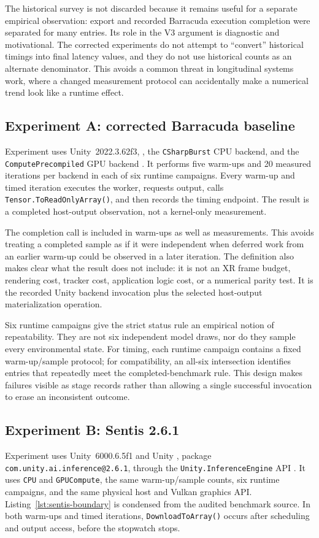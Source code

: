 The historical survey is not discarded because it remains useful for a separate empirical observation: export and recorded Barracuda execution completion were separated for many entries. Its role in the V3 argument is diagnostic and motivational. The corrected experiments do not attempt to ``convert'' historical timings into final latency values, and they do not use historical counts as an alternate denominator. This avoids a common threat in longitudinal systems work, where a changed measurement protocol can accidentally make a numerical trend look like a runtime effect.

\subsection{Experiment A: corrected Barracuda baseline}
Experiment \A uses Unity~2022.3.62f3, \Barracuda, the \texttt{CSharpBurst} CPU backend, and the \texttt{ComputePrecompiled} GPU backend \citep{barracudaManual}. It performs five warm-ups and 20 measured iterations per backend in each of six runtime campaigns. Every warm-up and timed iteration executes the worker, requests output, calls \texttt{Tensor.ToReadOnlyArray()}, and then records the timing endpoint. The result is a completed host-output observation, not a kernel-only measurement.

The completion call is included in warm-ups as well as measurements. This avoids treating a completed sample as if it were independent when deferred work from an earlier warm-up could be observed in a later iteration. The definition also makes clear what the result does not include: it is not an XR frame budget, rendering cost, tracker cost, application logic cost, or a numerical parity test. It is the recorded Unity backend invocation plus the selected host-output materialization operation.

Six runtime campaigns give the strict status rule an empirical notion of repeatability. They are not six independent model draws, nor do they sample every environmental state. For timing, each runtime campaign contains a fixed warm-up/sample protocol; for compatibility, an all-six intersection identifies entries that repeatedly meet the completed-benchmark rule. This design makes failures visible as stage records rather than allowing a single successful invocation to erase an inconsistent outcome.

\subsection{Experiment B: Sentis 2.6.1}
Experiment \B uses Unity~6000.6.5f1 and Unity \Sentis, package \texttt{com.unity.ai.inference@2.6.1}, through the \texttt{Unity.InferenceEngine} API \citep{unityInferenceEngine}. It uses \texttt{CPU} and \texttt{GPUCompute}, the same warm-up/sample counts, six runtime campaigns, and the same physical host and Vulkan graphics API. Listing~\ref{lst:sentis-boundary} is condensed from the audited benchmark source. In both warm-ups and timed iterations, \texttt{DownloadToArray()} occurs after scheduling and output access, before the stopwatch stops.

